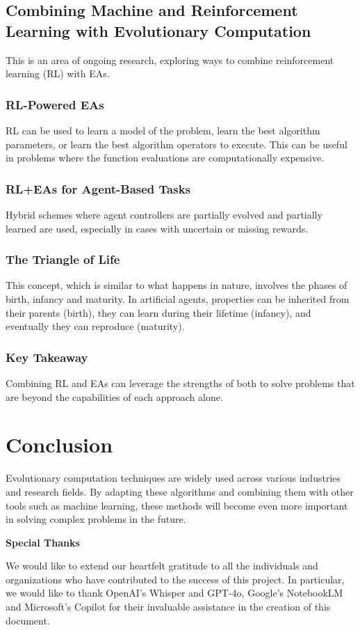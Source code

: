 \subsection*{Combining Machine and Reinforcement Learning with Evolutionary Computation}
This is an area of ongoing research, exploring ways to combine reinforcement learning (RL) with EAs.
\subsubsection*{RL-Powered EAs}
RL can be used to learn a model of the problem, learn the best algorithm parameters, or learn the best algorithm operators to execute. This can be useful in problems where the function evaluations are computationally expensive.
\subsubsection*{RL+EAs for Agent-Based Tasks}
Hybrid schemes where agent controllers are partially evolved and partially learned are used, especially in cases with uncertain or missing rewards.
\subsubsection*{The Triangle of Life}
This concept, which is similar to what happens in nature, involves the phases of birth, infancy and maturity. In artificial agents, properties can be inherited from their parents (birth), they can learn during their lifetime (infancy), and eventually they can reproduce (maturity).
\subsubsection*{Key Takeaway}
Combining RL and EAs can leverage the strengths of both to solve problems that are beyond the capabilities of each approach alone.

\section{Conclusion}
Evolutionary computation techniques are widely used across various industries and research fields. By adapting these algorithms and combining them with other tools such as machine learning, these methods will become even more important in solving complex problems in the future.

\newpage

\thispagestyle{empty}
\vspace*{\fill}
\begin{center}
    \textbf{\Large Special Thanks}
    \vspace{1cm}
    
    We would like to extend our heartfelt gratitude to all the individuals and organizations who have contributed to the success of this project. In particular, we would like to thank OpenAI's Whisper and GPT-4o, Google's NotebookLM and Microsoft's Copilot for their invaluable assistance in the creation of this document.
\end{center}
\vspace*{\fill}
\newpage


